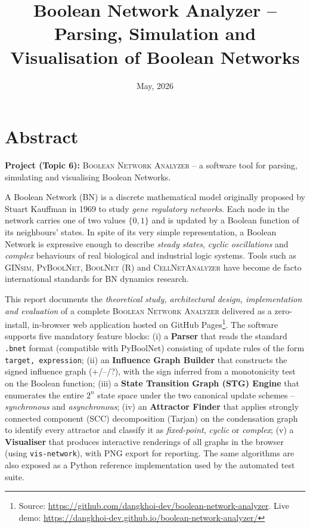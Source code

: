 \documentclass[oneside,final]{hcmut-report}
\title{Boolean Network Analyzer -- Parsing, Simulation and Visualisation of Boolean Networks}
\date{May, 2026}
\begin{document}
\coverpage

\setcounter{secnumdepth}{3}
\setcounter{tocdepth}{3}


\cleardoublepage
{}
{}
\section*{Abstract}

\noindent\textbf{Project (Topic 6):} \textsc{Boolean Network Analyzer} -- a software tool for parsing, simulating and visualising Boolean Networks.

\vspace{0.4em}

A Boolean Network (BN) is a discrete mathematical model originally proposed by Stuart Kauffman in 1969 to study \textit{gene regulatory networks}. Each node in the network carries one of two values $\{0, 1\}$ and is updated by a Boolean function of its neighbours' states. In spite of its very simple representation, a Boolean Network is expressive enough to describe \textit{steady states}, \textit{cyclic oscillations} and \textit{complex} behaviours of real biological and industrial logic systems. Tools such as \textsc{GINsim}, \textsc{PyBoolNet}, \textsc{BoolNet} (R) and \textsc{CellNetAnalyzer} have become de facto international standards for BN dynamics research.

\vspace{0.3em}

This report documents the \textit{theoretical study, architectural design, implementation and evaluation} of a complete \textsc{Boolean Network Analyzer} delivered as a zero-install, in-browser web application hosted on GitHub Pages\footnote{Source: \url{https://github.com/dangkhoi-dev/boolean-network-analyzer}. Live demo: \url{https://dangkhoi-dev.github.io/boolean-network-analyzer/}}. The software supports five mandatory feature blocks: (i) a \textbf{Parser} that reads the standard \texttt{.bnet} format (compatible with PyBoolNet) consisting of update rules of the form \texttt{target, expression}; (ii) an \textbf{Influence Graph Builder} that constructs the signed influence graph (+/--/?), with the sign inferred from a monotonicity test on the Boolean function; (iii) a \textbf{State Transition Graph (STG) Engine} that enumerates the entire $2^n$ state space under the two canonical update schemes -- \textit{synchronous} and \textit{asynchronous}; (iv) an \textbf{Attractor Finder} that applies strongly connected component (SCC) decomposition (Tarjan) on the condensation graph to identify every attractor and classify it as \textit{fixed-point}, \textit{cyclic} or \textit{complex}; (v) a \textbf{Visualiser} that produces interactive renderings of all graphs in the browser (using \texttt{vis-network}), with PNG export for reporting. The same algorithms are also exposed as a Python reference implementation used by the automated test suite.
\end{document}
